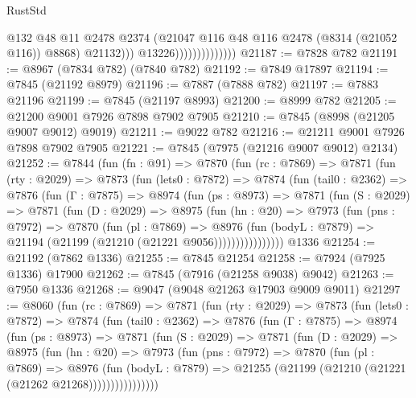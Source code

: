 \begin{lexlean}{RustStd}
\begin{coremodule}
                                      @132
                                      @48
                                      @11
                                      @2478
                                      @2374
                                      (@21047 @116 @48 @116 @2478 (@8314 (@21052 @116)) @8868)
                                      @21132)))
                                @13226))))))))))))))
@21187 := @7828 @782
@21191 := @8967 (@7834 @782) (@7840 @782)
@21192 := @7849 @17897
@21194 := @7845 (@21192 @8979)
@21196 := @7887 (@7888 @782)
@21197 := @7883 @21196
@21199 := @7845 (@21197 @8993)
@21200 := @8999 @782
@21205 := @21200 @9001 @7926 @7898 @7902 @7905
@21210 := @7845 (@8998 (@21205 @9007 @9012) @9019)
@21211 := @9022 @782
@21216 := @21211 @9001 @7926 @7898 @7902 @7905
@21221 := @7845 (@7975 (@21216 @9007 @9012) @2134)
@21252 := @7844
    (fun (fn : @91) =>
    @7870
      (fun (rc : @7869) =>
      @7871
        (fun (rty : @2029) =>
        @7873
          (fun (lets0 : @7872) =>
          @7874
            (fun (tail0 : @2362) =>
            @7876
              (fun (Γ : @7875) =>
              @8974
                (fun (ps : @8973) =>
                @7871
                  (fun (S : @2029) =>
                  @7871
                    (fun (D : @2029) =>
                    @8975
                      (fun (hn : @20) =>
                      @7973
                        (fun (pns : @7972) =>
                        @7870
                          (fun (pl : @7869) =>
                          @8976
                            (fun (bodyL : @7879) =>
                            @21194 (@21199 (@21210 (@21221 @9056))))))))))))))))
    @1336
@21254 := @21192 (@7862 @1336)
@21255 := @7845 @21254
@21258 := @7924 (@7925 @1336) @17900
@21262 := @7845 (@7916 (@21258 @9038) @9042)
@21263 := @7950 @1336
@21268 := @9047 (@9048 @21263 @17903 @9009 @9011)
@21297 := @8060
    (fun (rc : @7869) =>
    @7871
      (fun (rty : @2029) =>
      @7873
        (fun (lets0 : @7872) =>
        @7874
          (fun (tail0 : @2362) =>
          @7876
            (fun (Γ : @7875) =>
            @8974
              (fun (ps : @8973) =>
              @7871
                (fun (S : @2029) =>
                @7871
                  (fun (D : @2029) =>
                  @8975
                    (fun (hn : @20) =>
                    @7973
                      (fun (pns : @7972) =>
                      @7870
                        (fun (pl : @7869) =>
                        @8976
                          (fun (bodyL : @7879) =>
                          @21255 (@21199 (@21210 (@21221 (@21262 @21268))))))))))))))))

\end{coremodule}
\end{lexlean}
